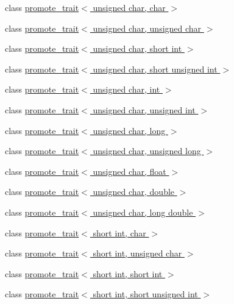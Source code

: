 \begin{DoxyCompactItemize}
class \hyperlink{classpromote__trait_3_01unsigned_01char_00_01char_01_4}{promote\+\_\+trait$<$ unsigned char, char $>$}
\item 
class \hyperlink{classpromote__trait_3_01unsigned_01char_00_01unsigned_01char_01_4}{promote\+\_\+trait$<$ unsigned char, unsigned char $>$}
\item 
class \hyperlink{classpromote__trait_3_01unsigned_01char_00_01short_01int_01_4}{promote\+\_\+trait$<$ unsigned char, short int $>$}
\item 
class \hyperlink{classpromote__trait_3_01unsigned_01char_00_01short_01unsigned_01int_01_4}{promote\+\_\+trait$<$ unsigned char, short unsigned int $>$}
\item 
class \hyperlink{classpromote__trait_3_01unsigned_01char_00_01int_01_4}{promote\+\_\+trait$<$ unsigned char, int $>$}
\item 
class \hyperlink{classpromote__trait_3_01unsigned_01char_00_01unsigned_01int_01_4}{promote\+\_\+trait$<$ unsigned char, unsigned int $>$}
\item 
class \hyperlink{classpromote__trait_3_01unsigned_01char_00_01long_01_4}{promote\+\_\+trait$<$ unsigned char, long $>$}
\item 
class \hyperlink{classpromote__trait_3_01unsigned_01char_00_01unsigned_01long_01_4}{promote\+\_\+trait$<$ unsigned char, unsigned long $>$}
\item 
class \hyperlink{classpromote__trait_3_01unsigned_01char_00_01float_01_4}{promote\+\_\+trait$<$ unsigned char, float $>$}
\item 
class \hyperlink{classpromote__trait_3_01unsigned_01char_00_01double_01_4}{promote\+\_\+trait$<$ unsigned char, double $>$}
\item 
class \hyperlink{classpromote__trait_3_01unsigned_01char_00_01long_01double_01_4}{promote\+\_\+trait$<$ unsigned char, long double $>$}
\item 
class \hyperlink{classpromote__trait_3_01short_01int_00_01char_01_4}{promote\+\_\+trait$<$ short int, char $>$}
\item 
class \hyperlink{classpromote__trait_3_01short_01int_00_01unsigned_01char_01_4}{promote\+\_\+trait$<$ short int, unsigned char $>$}
\item 
class \hyperlink{classpromote__trait_3_01short_01int_00_01short_01int_01_4}{promote\+\_\+trait$<$ short int, short int $>$}
\item 
class \hyperlink{classpromote__trait_3_01short_01int_00_01short_01unsigned_01int_01_4}{promote\+\_\+trait$<$ short int, short unsigned int $>$}

\end{DoxyCompactItemize}
